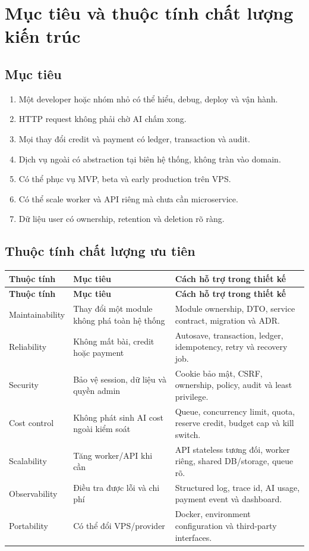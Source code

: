 \documentclass[11pt,a4paper]{article}
\begin{document}
\section{Mục tiêu và thuộc tính chất lượng kiến trúc}

\subsection{Mục tiêu}
\begin{enumerate}
  \item Một developer hoặc nhóm nhỏ có thể hiểu, debug, deploy và vận hành.
  \item HTTP request không phải chờ AI chấm xong.
  \item Mọi thay đổi credit và payment có ledger, transaction và audit.
  \item Dịch vụ ngoài có abstraction tại biên hệ thống, không tràn vào domain.
  \item Có thể phục vụ MVP, beta và early production trên VPS.
  \item Có thể scale worker và API riêng mà chưa cần microservice.
  \item Dữ liệu user có ownership, retention và deletion rõ ràng.
\end{enumerate}

\subsection{Thuộc tính chất lượng ưu tiên}
\begin{longtable}{|P{0.22\textwidth}|P{0.31\textwidth}|P{0.37\textwidth}|}
\hline
\textbf{Thuộc tính} & \textbf{Mục tiêu} & \textbf{Cách hỗ trợ trong thiết kế} \\ \hline
\endfirsthead
\hline
\textbf{Thuộc tính} & \textbf{Mục tiêu} & \textbf{Cách hỗ trợ trong thiết kế} \\ \hline
\endhead
Maintainability & Thay đổi một module không phá toàn hệ thống & Module ownership, DTO, service contract, migration và ADR. \\ \hline
Reliability & Không mất bài, credit hoặc payment & Autosave, transaction, ledger, idempotency, retry và recovery job. \\ \hline
Security & Bảo vệ session, dữ liệu và quyền admin & Cookie bảo mật, CSRF, ownership, policy, audit và least privilege. \\ \hline
Cost control & Không phát sinh AI cost ngoài kiểm soát & Queue, concurrency limit, quota, reserve credit, budget cap và kill switch. \\ \hline
Scalability & Tăng worker/API khi cần & API stateless tương đối, worker riêng, shared DB/storage, queue rõ. \\ \hline
Observability & Điều tra được lỗi và chi phí & Structured log, trace id, AI usage, payment event và dashboard. \\ \hline
Portability & Có thể đổi VPS/provider & Docker, environment configuration và third-party interfaces. \\ \hline
\end{longtable}
\end{document}
